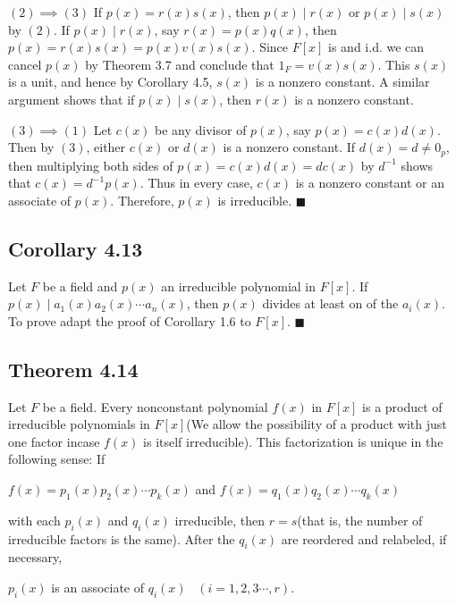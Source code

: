 \documentclass{article}
\begin{document}
\vspace*{5mm}
$(2) \implies (3)$ If $p(x) = r(x)s(x)$, then $p(x)\mid r(x)$ or
$p(x)\mid s(x)$ by $(2)$. If $p(x)\mid r(x)$, say $r(x) = p(x)q(x)$,
then $p(x)=r(x)s(x) = p(x)v(x)s(x)$. Since $F[x]$ is and i.d.
we can cancel $p(x)$ by Theorem 3.7 and conclude that $1_F = v(x)s(x)$.
This $s(x)$ is a unit, and hence by Corollary 4.5, $s(x)$ is a nonzero constant.
A similar argument shows that if $p(x)\mid s(x)$, then $r(x)$ is a nonzero constant.

\vspace*{5mm}
$(3) \implies (1)$ Let $c(x)$ be any divisor of $p(x)$, say $p(x) = c(x)d(x)$.
Then by $(3)$, either $c(x)$ or $d(x)$ is a nonzero constant.
If $d(x) = d \neq 0_p$, then multiplying both sides of
$p(x) = c(x)d(x) = dc(x)$ by $d^{-1}$ shows that $c(x) = d^{-1}p(x)$.
Thus in every case, $c(x)$ is a nonzero constant or an 
associate of $p(x)$. Therefore, $p(x)$ is irreducible. $\blacksquare$

\subsection*{Corollary 4.13}
Let $F$ be a field and $p(x)$ an irreducible polynomial in $F[x]$.
If $p(x)\mid a_1(x)a_2(x)\cdots a_n(x)$, then $p(x)$ divides at least on of the $a_i(x)$.
To prove adapt the proof of Corollary 1.6 to $F[x]$. $\blacksquare$ 

\subsection*{Theorem 4.14}
Let $F$ be a field. Every nonconstant polynomial $f(x)$ in $F[x]$ is a product of irreducible polynomials 
in $F[x]$(We allow the possibility of a product with just one factor incase $f(x)$ is itself irreducible).
This factorization is unique in the following sense: If
\begin{center}
    $f(x) = p_1(x)p_2(x)\cdots p_k(x)$ and $f(x) = q_1(x)q_2(x)\cdots q_k(x)$
\end{center}

with each $p_i(x)$ and $q_i(x)$ irreducible, then $r = s$(that is,
the number of irreducible factors is the same). After the $q_i(x)$
are reordered and relabeled, if necessary,
\begin{center}
    $p_i(x)$ is an associate of $q_i(x)$ \, $(i = 1,2,3\cdots,r)$.
\end{center}
\end{document}
